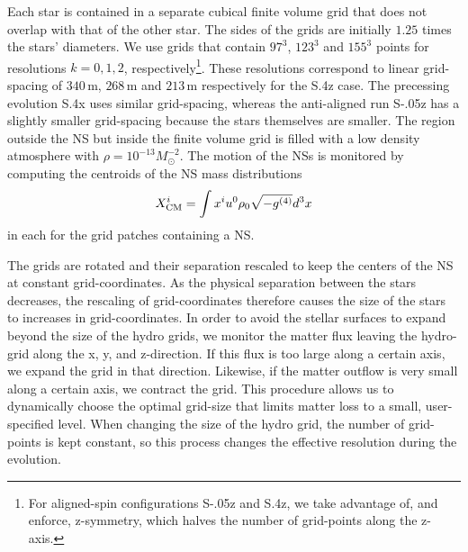 \documentclass[aps,prd,amsmath,floatfix
,twocolumn
,superscriptaddress,nofootinbib,showpacs]{revtex4-1}
\theoremstyle{plain} \newtheorem{thm}{Theorem} \newtheorem{lem}{Lemma}
\newcommand{\red}[1]{\textcolor{Red}{#1}}
\begin{document}
Each star is contained in a separate cubical finite volume grid that does not
overlap with that of the other star. The sides of the grids
are initially $1.25$ times the stars' diameters. We use
grids that contain $97^3$, $123^3$ and $155^3$ points for resolutions
$k=0,1,2$,
respectively\footnote{For aligned-spin configurations S-.05z and
  S.4z, we take advantage of, and enforce, z-symmetry, which halves
  the number of grid-points along the z-axis.}.  These resolutions
correspond to linear grid-spacing of $340\,\text{m}$, $268\,\text{m}$ and
$213\,\text{m}$
respectively for the S.4z case.  The precessing evolution S.4x uses
similar grid-spacing, whereas the anti-aligned run S-.05z has a
slightly smaller grid-spacing because the stars themselves are
smaller. The region outside the NS but inside the finite volume grid
is filled with a low density atmosphere with
$\rho=10^{-13}M_{\odot}^{-2}$.  The motion of the NSs is monitored by
computing the centroids of the NS mass distributions
\begin{equation}
\label{eq:centroid}
X^i_{\rm CM} = \int{x^iu^0\rho_0\sqrt{-g^{(4)}}d^3x}
\end{equation}
in each for the grid patches containing a NS.

The grids are rotated and their separation rescaled to keep the centers of
the NS at constant grid-coordinates.  As the physical separation
between the stars decreases, the rescaling of grid-coordinates
therefore causes the size of the stars to increases in
grid-coordinates.  In order to avoid the stellar surfaces to expand
beyond the size of the hydro grids, we monitor the matter flux leaving
the hydro-grid along the x, y, and z-direction.  If this flux is too large
along a certain axis, we expand the grid in that direction. Likewise,
if the matter outflow is very small along a certain axis, we contract
the grid.  This procedure allows us to dynamically choose the optimal
grid-size that limits matter loss to a small, user-specified level.
When changing the size of the hydro grid, the number of grid-points is
kept constant, so this process changes the effective resolution during
the evolution.
\end{document}
